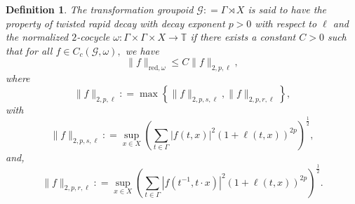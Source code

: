 \documentclass[a4paper,11pt,reqno]{amsart}
\theoremstyle{plain}
\newtheorem{defn}[thm]{Definition}
\theoremstyle{mainthmstyle}
\theoremstyle{named}
\numberwithin{equation}{section}
\begin{document}
\begin{defn}
\label{rapid decay}
The transformation groupoid $\mathcal G : = \Gamma \rtimes X$ is said to have the property of twisted rapid decay with decay exponent $p > 0$ with respect to $\ell$ and the normalized $2$-cocycle $\omega : \Gamma \times \Gamma \times X \rightarrow \mathbb T$ if there exists a constant $C > 0$ such that for all $f \in C_c (\mathcal G, \omega),$ we have
$$\|f\|_{\mathrm {red}, \omega} \leq C \|f\|_{2, p, \ell},$$
where
$$\|f\|_{2, p, \ell} : = \max \left \{\|f\|_{2, p, s, \ell}, \|f\|_{2, p, r, \ell} \right \},$$ with
$$\|f\|_{2,p,s,\ell} : = \sup\limits_{x \in X} \left (\sum\limits_{t \in \Gamma} \left \lvert f(t, x) \right \rvert^2 (1 + \ell (t, x))^{2 p} \right )^{\frac {1} {2}},$$ 
and,
$$\|f\|_{2,p,r, \ell} : = \sup\limits_{x \in X} \left (\sum\limits_{t \in \Gamma} \left \lvert f \left (t^{-1}, t \cdot x \right ) \right \rvert^2 (1 + \ell (t, x))^{2 p} \right )^{\frac {1} {2}}.$$
\end{defn}
 
\end{document}
